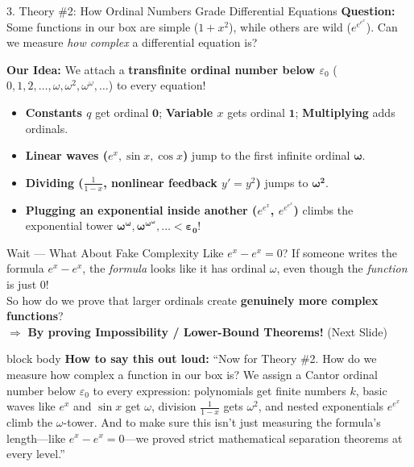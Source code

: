 \documentclass[aspectratio=169,11pt]{beamer}
\newcommand{\say}[1]{%
  \vfill
  \begin{beamercolorbox}[sep=5pt,rounded=true,shadow=false]{block body}
  {\footnotesize \textbf{\textcolor{deepblue}{How to say this out loud:}} ``#1''}
  \end{beamercolorbox}
}
\begin{document}
\begin{frame}[shrink=8]{3. Theory \#2: How Ordinal Numbers Grade Differential Equations}
  \textbf{Question:} Some functions in our box are simple ($1 + x^2$), while others are wild ($e^{e^{e^x}}$). Can we measure \emph{how complex} a differential equation is?

  \vspace{0.1cm}
  \textbf{Our Idea:} We attach a \textbf{transfinite ordinal number below $\varepsilon_0$} ($0, 1, 2, \dots, \omega, \omega^2, \omega^\omega, \dots$) to every equation!
  \begin{itemize}
    \item \textbf{Constants $q$} get ordinal $\mathbf{0}$; \quad \textbf{Variable $x$} gets ordinal $\mathbf{1}$; \quad \textbf{Multiplying} adds ordinals.
    \item \textbf{Linear waves ($e^x, \sin x, \cos x$)} jump to the first infinite ordinal $\boldsymbol{\omega}$.
    \item \textbf{Dividing ($\frac{1}{1-x}$, nonlinear feedback $y'=y^2$)} jumps to $\boldsymbol{\omega^2}$.
    \item \textbf{Plugging an exponential inside another ($e^{e^x}$, $e^{e^{e^x}}$)} climbs the exponential tower $\boldsymbol{\omega^\omega, \omega^{\omega^\omega}, \dots < \varepsilon_0}$!
  \end{itemize}

  \begin{block}{Wait --- What About Fake Complexity Like $e^x - e^x = 0$?}
    If someone writes the formula $e^x - e^x$, the \emph{formula} looks like it has ordinal $\omega$, even though the \emph{function} is just $0$!\\[2pt]
    So how do we prove that larger ordinals create \textbf{genuinely more complex functions}?\\
    $\Longrightarrow$ \textbf{By proving Impossibility / Lower-Bound Theorems!} (Next Slide)
  \end{block}

  \say{Now for Theory \#2. How do we measure how complex a function in our box is? We assign a Cantor ordinal number below $\varepsilon_0$ to every expression: polynomials get finite numbers $k$, basic waves like $e^x$ and $\sin x$ get $\omega$, division $\frac{1}{1-x}$ gets $\omega^2$, and nested exponentials $e^{e^x}$ climb the $\omega$-tower. And to make sure this isn't just measuring the formula's length---like $e^x - e^x = 0$---we proved strict mathematical separation theorems at every level.}
\end{frame}
\end{document}
